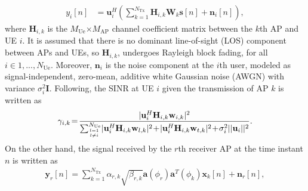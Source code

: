 \documentclass[conference,twocolumn,a4paper]{IEEEtran}
\theoremstyle{remark} \newtheorem{remark}{Remark}
\begin{document}
\begin{align}\label{eq:signali}
    y_{i}[n]&= \mathbf{u}_i^H\left(\sum_{k=1}^{N_{\mathrm{Tx}}}\mathbf{H}_{i,k}\mathbf{W}_{k}\mathbf{s}[n] +\mathbf{n}_i[n]\right),
\end{align}
where $\mathbf{H}_{i,k}$ is the $M_{\mathrm{Ue}}$$\times$$M_{\mathrm{AP}}$ channel coefficient matrix between the $k$th AP and UE $i$. It is assumed that there is no dominant line-of-sight (LOS) component between APs and UEs, so $\mathbf{H}_{i,k}$,   undergoes Rayleigh block fading, for all $i \in 1, ..., N_{\mathrm{Ue}}$. Moreover, $\mathbf{n}_i$ is the noise component at the $i$th user, modeled as signal-independent, zero-mean, additive white Gaussian noise (AWGN) with variance $\sigma^2_i\mathbf{I}$. Following, the SINR at UE $i$ given the transmission of AP $k$ is written as
\begin{align}
    \gamma_{i,k}\!=\!\frac{|\mathbf{u}_i^H\mathbf{H}_{i,k}\mathbf{w}_{i,k}|^2}{\sum_{l=1 \atop l \neq i}^{N_{\mathrm{Ue}}}\!|\mathbf{u}_i^H\mathbf{H}_{i,k}\mathbf{w}_{l,k}|^2\!+\!|\mathbf{u}_i^H\mathbf{H}_{i,k}\mathbf{w}_{t,k}|^2\!+\!\sigma^2_i||\mathbf{u}_i||^2}.
\end{align}
On the other hand, the signal received by the $r$th receiver AP at the time instant $n$ is written as
\begin{align}
\mathbf{y}_r[n]\!=\!\!\!\sum_{k=1}^{N_{\mathrm{Tx}}}\!\!\alpha_{r,k} \sqrt{\beta_{r,k}}\mathbf{a}(\phi_r)\mathbf{a}^T(\phi_k)\mathbf{x}_k[n] \!+\!\mathbf{n}_r[n],
\end{align}
\end{document}
